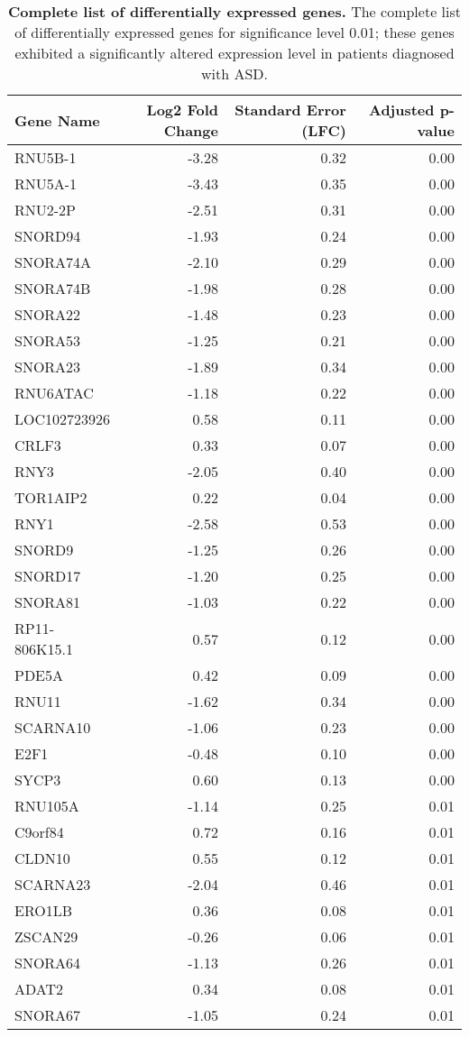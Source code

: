 \begin{table}[ht]
\centering
\begin{tabular}{lrrr}
  \hline
Gene Name & Log2 Fold Change & Standard Error (LFC) & Adjusted p-value \\ 
  \hline
RNU5B-1 & -3.28 & 0.32 & 0.00 \\ 
  RNU5A-1 & -3.43 & 0.35 & 0.00 \\ 
  RNU2-2P & -2.51 & 0.31 & 0.00 \\ 
  SNORD94 & -1.93 & 0.24 & 0.00 \\ 
  SNORA74A & -2.10 & 0.29 & 0.00 \\ 
  SNORA74B & -1.98 & 0.28 & 0.00 \\ 
  SNORA22 & -1.48 & 0.23 & 0.00 \\ 
  SNORA53 & -1.25 & 0.21 & 0.00 \\ 
  SNORA23 & -1.89 & 0.34 & 0.00 \\ 
  RNU6ATAC & -1.18 & 0.22 & 0.00 \\ 
  LOC102723926 & 0.58 & 0.11 & 0.00 \\ 
  CRLF3 & 0.33 & 0.07 & 0.00 \\ 
  RNY3 & -2.05 & 0.40 & 0.00 \\ 
  TOR1AIP2 & 0.22 & 0.04 & 0.00 \\ 
  RNY1 & -2.58 & 0.53 & 0.00 \\ 
  SNORD9 & -1.25 & 0.26 & 0.00 \\ 
  SNORD17 & -1.20 & 0.25 & 0.00 \\ 
  SNORA81 & -1.03 & 0.22 & 0.00 \\ 
  RP11-806K15.1 & 0.57 & 0.12 & 0.00 \\ 
  PDE5A & 0.42 & 0.09 & 0.00 \\ 
  RNU11 & -1.62 & 0.34 & 0.00 \\ 
  SCARNA10 & -1.06 & 0.23 & 0.00 \\ 
  E2F1 & -0.48 & 0.10 & 0.00 \\ 
  SYCP3 & 0.60 & 0.13 & 0.00 \\ 
  RNU105A & -1.14 & 0.25 & 0.01 \\ 
  C9orf84 & 0.72 & 0.16 & 0.01 \\ 
  CLDN10 & 0.55 & 0.12 & 0.01 \\ 
  SCARNA23 & -2.04 & 0.46 & 0.01 \\ 
  ERO1LB & 0.36 & 0.08 & 0.01 \\ 
  ZSCAN29 & -0.26 & 0.06 & 0.01 \\ 
  SNORA64 & -1.13 & 0.26 & 0.01 \\ 
  ADAT2 & 0.34 & 0.08 & 0.01 \\ 
  SNORA67 & -1.05 & 0.24 & 0.01 \\ 
   \hline
\end{tabular}
\caption{\textbf{Complete list of differentially expressed genes.} The complete list of differentially expressed genes for significance level 0.01; these genes exhibited a significantly altered expression level in patients diagnosed with ASD.} 
\label{tbl:alldeg}
\end{table}

